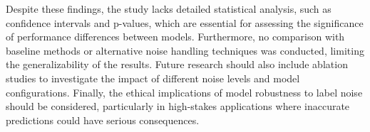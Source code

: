 \documentclass{article}
\begin{document}
Despite these findings, the study lacks detailed statistical analysis, such as confidence intervals and p-values, which are essential for assessing the significance of performance differences between models. Furthermore, no comparison with baseline methods or alternative noise handling techniques was conducted, limiting the generalizability of the results. Future research should also include ablation studies to investigate the impact of different noise levels and model configurations. Finally, the ethical implications of model robustness to label noise should be considered, particularly in high-stakes applications where inaccurate predictions could have serious consequences.
\end{document}
